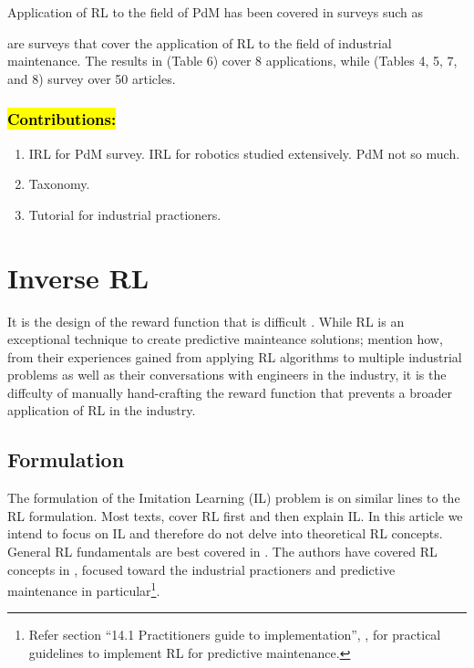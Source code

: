 \documentclass{article}
\newcommand{\hlc}[2][blue!10]{{\colorlet{foo}{#1} \sethlcolor{foo}\hl{#2}}}
\begin{document}
Application of RL to the field of PdM has been covered in surveys such as \cite{Erhan2021Smart, Ren2021, Barja-Martinez2021, panzer2022, siraskar2023}

\cite{panzer2022, siraskar2023} are surveys that cover the application of RL to the field of industrial maintenance. The results in \cite{panzer2022} (Table 6) cover 8 applications, while \cite{siraskar2023} (Tables 4, 5, 7, and 8) survey over 50 articles.

\subsubsection*{\hlc{Contributions:}}
\begin{enumerate}
	\item IRL for PdM survey. IRL for robotics studied extensively. PdM not so much.
	\item Taxonomy.
	\item Tutorial for industrial practioners.
\end{enumerate}

\section{Inverse RL}

It is the design of the reward function that is difficult \citep{abbeel2004apprenticeship, ng2000algorithms}.
While RL is an exceptional technique to create predictive mainteance solutions; \cite{abbeel2004apprenticeship} mention how, from their experiences gained from applying RL algorithms to multiple industrial problems as well as their conversations with engineers in the industry, it is the diffculty of manually hand-crafting the reward function that prevents a broader application of RL in the industry.

\subsection{Formulation} 

The formulation of the Imitation Learning (IL) problem is on similar lines to the RL formulation. Most texts, cover RL first and then explain IL. In this article we intend to focus on IL and therefore do not delve into theoretical RL concepts. General RL fundamentals are best covered in \citep{sutton2018, stanford-lectures}. The authors have covered RL concepts in \cite{siraskar2023}, focused toward the industrial practioners and predictive maintenance in particular\footnote{Refer section ``14.1 Practitioners guide to implementation'', \citep{siraskar2023}, for practical guidelines to implement RL for predictive maintenance.}.  
\end{document}
